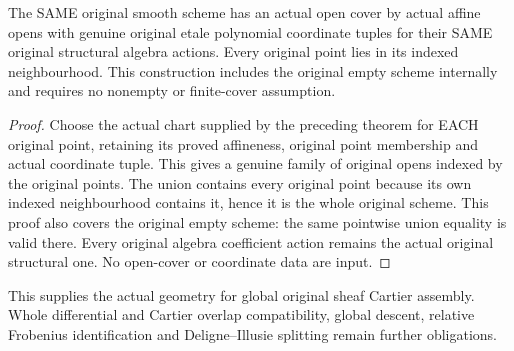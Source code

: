 \begin{theorem}
\label{thm:cartier-smooth-original-etale-affine-cover}
\leanok
The SAME original smooth scheme has an actual open cover by actual
affine opens with genuine original etale polynomial coordinate tuples
for their SAME original structural algebra actions. Every original
point lies in its indexed neighbourhood. This construction includes
the original empty scheme internally and requires no nonempty or
finite-cover assumption.
\end{theorem}
\begin{proof}
Choose the actual chart supplied by the preceding theorem for EACH
original point, retaining its proved affineness, original point
membership and actual coordinate tuple. This gives a genuine family
of original opens indexed by the original points. The union contains
every original point because its own indexed neighbourhood contains
it, hence it is the whole original scheme. This proof also covers
the original empty scheme: the same pointwise union equality is
valid there. Every original algebra coefficient action remains the
actual original structural one. No open-cover or coordinate data
are input.
\end{proof}

This supplies the actual geometry for global original sheaf Cartier
assembly. Whole differential and Cartier overlap compatibility,
global descent, relative Frobenius identification and
Deligne--Illusie splitting remain further obligations.
